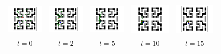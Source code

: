 \documentclass[letterpaper]{article} %
\begin{document}
\begin{figure}[t]
	\centering
	\begin{tabular}{ccccc}
		\includegraphics[width=0.18\linewidth]{figs/94/0.pdf} &
		\includegraphics[width=0.18\linewidth]{figs/94/2.pdf} &
		\includegraphics[width=0.18\linewidth]{figs/94/5.pdf} &
		\includegraphics[width=0.18\linewidth]{figs/94/10.pdf} &
		\includegraphics[width=0.18\linewidth]{figs/94/15.pdf} \\
		$t=0$ & $t=2$ & $t=5$ & $t=10$ & $t=15$
	\end{tabular}
\end{figure}
\end{document}
